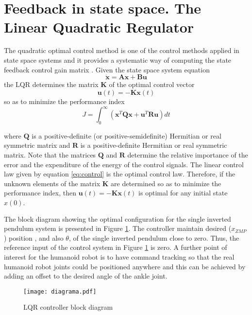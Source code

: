 \section{Feedback in state space. The Linear Quadratic Regulator}

The quadratic optimal control method is one of the control methods applied in state space systems and it provides a systematic way of computing the state feedback control gain matrix \cite{Ogata}.
Given the state space system equation
\begin{equation}
\mathbf{\dot{x}} = \mathbf{A}\textbf{x} + \mathbf{B}\mathbf{u}
\end{equation}
the LQR determines the matrix $\mathbf{K}$ of the optimal control vector
\begin{equation}
\mathbf{u}(t) = -\mathbf{Kx}(t)
\label{eq:control}
\end{equation}
so as to minimize the performance index
\begin{equation}
J = \int_{0}^{\infty}(\mathbf{x}^{T}\mathbf{Qx}+\mathbf{u}^{T}\mathbf{Ru}) dt
\end{equation}

where $\mathbf{Q}$ is a positive-definite (or positive-semidefinite) Hermitian or real symmetric matrix and $\mathbf{R}$ is a positive-definite Hermitian or real symmetric matrix. Note that the matrices $\mathbf{Q}$ and $\mathbf{R}$ determine the relative importance of the error and the expenditure of the energy of the control signals.
The linear control law given by equation \eqref{eq:control} is the optimal control law. Therefore, if the unknown elements of the matrix $\mathbf{K}$ are determined so as to minimize the performance index, then $\mathbf{u}(t) = -\mathbf{Kx}(t)$  is optimal for any initial state $x(0)$. 

The block diagram showing the optimal configuration for the single inverted pendulum system is presented in Figure \ref{fig:block_diagram}. The controller maintain desired ($x_{ZMP}$) position , and also $\theta$, of the single inverted pendulum close to zero. Thus, the reference input of the control system in Figure \ref{fig:block_diagram} is zero. A further point of interest for the humanoid robot is to have command tracking so that the real humanoid robot joints could be positioned anywhere and this can be achieved by adding an offset to the desired angle of the ankle joint.
\begin{figure}[!hbt]
\centering
\texttt{[image: diagrama.pdf]}
\caption{LQR controller block diagram}
\label{fig:block_diagram}
\end{figure}

